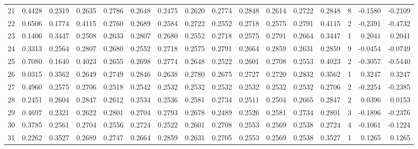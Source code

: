 \begin{tabular}{lrrrrrrrrrrrrrrr}
21  &      0.4428 &  0.2319 &  0.2635 &  0.2786 &  0.2648 &  0.2475 &  0.2620 &  0.2774 &  0.2848 &  0.2614 &   0.2722 &     0.2848 &      8 &                   -0.1580 &                    -0.2109 \\
22  &      0.6506 &  0.1774 &  0.4115 &  0.2760 &  0.2689 &  0.2584 &  0.2722 &  0.2552 &  0.2718 &  0.2575 &   0.2791 &     0.4115 &      2 &                   -0.2391 &                    -0.4732 \\
23  &      0.1406 &  0.3447 &  0.2508 &  0.2633 &  0.2807 &  0.2680 &  0.2552 &  0.2718 &  0.2575 &  0.2791 &   0.2664 &     0.3447 &      1 &                    0.2041 &                     0.2041 \\
24  &      0.3313 &  0.2564 &  0.2807 &  0.2680 &  0.2552 &  0.2718 &  0.2575 &  0.2791 &  0.2664 &  0.2859 &   0.2631 &     0.2859 &      9 &                   -0.0454 &                    -0.0749 \\
25  &      0.7080 &  0.1640 &  0.4023 &  0.2655 &  0.2698 &  0.2774 &  0.2648 &  0.2522 &  0.2601 &  0.2708 &   0.2553 &     0.4023 &      2 &                   -0.3057 &                    -0.5440 \\
26  &      0.0315 &  0.3562 &  0.2649 &  0.2749 &  0.2846 &  0.2638 &  0.2780 &  0.2675 &  0.2727 &  0.2720 &   0.2832 &     0.3562 &      1 &                    0.3247 &                     0.3247 \\
27  &      0.4960 &  0.2575 &  0.2706 &  0.2518 &  0.2542 &  0.2532 &  0.2532 &  0.2532 &  0.2532 &  0.2532 &   0.2532 &     0.2706 &      2 &                   -0.2254 &                    -0.2385 \\
28  &      0.2451 &  0.2604 &  0.2847 &  0.2612 &  0.2534 &  0.2536 &  0.2581 &  0.2734 &  0.2511 &  0.2504 &   0.2665 &     0.2847 &      2 &                    0.0396 &                     0.0153 \\
29  &      0.4697 &  0.2321 &  0.2622 &  0.2801 &  0.2704 &  0.2793 &  0.2678 &  0.2489 &  0.2526 &  0.2581 &   0.2734 &     0.2801 &      3 &                   -0.1896 &                    -0.2376 \\
30  &      0.3785 &  0.2561 &  0.2704 &  0.2556 &  0.2724 &  0.2522 &  0.2601 &  0.2708 &  0.2553 &  0.2569 &   0.2538 &     0.2724 &      4 &                   -0.1061 &                    -0.1224 \\
31  &      0.2262 &  0.3527 &  0.2689 &  0.2747 &  0.2664 &  0.2859 &  0.2631 &  0.2705 &  0.2553 &  0.2569 &   0.2538 &     0.3527 &      1 &                    0.1265 &                     0.1265 \\

\end{tabular}
